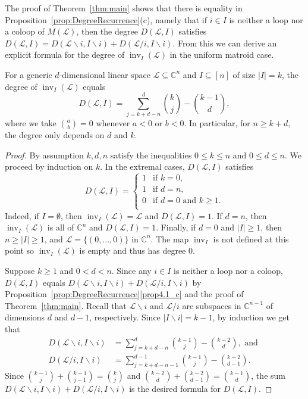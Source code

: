\documentclass[ALCO,ThmDefs,Unicode,epreuves]{cedram}
\newcommand{\Cbb}{\mathbb{C}}
\newcommand{\cL}{\mathcal{L}}
\DeclareMathOperator{\inv}{inv}
\begin{document}
 
 
 
The proof of Theorem~\ref{thm:main} shows that there is equality in Proposition~\ref{prop:DegreeRecurrence}(c), namely that 
if $i\in I$ is neither a loop nor a coloop of $M(\cL)$, then the degree $D(\cL, I) $ satisfies $D(\cL, I) = D(\cL\backslash i, I\backslash i ) + D(\cL/ i, I\backslash i )$. 
From this we can derive an explicit formula for the degree of $\inv_I(\cL)$ in the uniform matroid case. 



\begin{coro}\label{cor:genericDegree}
For a generic $d$-dimensional linear space $\cL \subseteq \Cbb^n$ and $I\subseteq [n]$ of size $|I|=k$, the degree of $\inv_I(\cL)$ equals 
\[
D(\cL,I)= \sum_{j=k+d - n}^{d}\binom{k}{j} -\binom{k-1}{d} ,
\] 
where we take $\binom{a}{b}=0$ whenever $a < 0$ or $b<0$. In particular, for $n \geq k+d$, the degree only depends on $d$ and $k$. 
\end{coro}
\begin{proof}
By assumption $k,d,n$ satisfy the inequalities $0\leq k \leq n$ and $0\leq d \leq n$.
We proceed by induction on $k$. In the extremal cases, $D(\cL, I)$ satisfies 
\[
D(\cL,I) = 
\begin{cases}
1 & \text{if }k=0, \\
1 & \text{if } d=n, \\
0 & \text{if }d= 0 \text{ and } k \geq 1. \\
\end{cases}
\]
Indeed, if $I = \emptyset$, then $\inv_I(\cL) = \cL$ and $D(\cL,I) = 1$. If $d=n$, then $\inv_I(\cL)$ is all of $\Cbb^n$ and $D(\cL,I) = 1$. 
Finally, if $d=0$ and $|I|\geq 1$, then $n\geq |I| \geq 1$, and $\cL= \{(0,\ldots , 0)\}$ in $\Cbb^n$. The map $\inv_I$ is not defined at this point so $\inv_I(\cL)$
is empty and thus has degree $0$. 

Suppose $k\geq 1$ and $0 <d < n$. 
Since any $i\in I$ is neither a loop nor a coloop, $D(\cL, I) $ equals $D(\cL\backslash i, I\backslash i ) + D(\cL/ i, I\backslash i )$ by Proposition~\ref{prop:DegreeRecurrence}\ref{prop4.1_c} and the proof of Theorem~\ref{thm:main}. Recall that $\cL\backslash i$ and $\cL/i$ are subspaces in $\Cbb^{n-1}$ of dimensions $d$ and $d-1$, respectively. 
Since $|I\backslash i| = k-1$, by induction we get that 
\begin{align*}
 D(\cL\backslash i, I\backslash i ) &= \sum_{j=k+d - n}^{d}\binom{k-1}{j} -\binom{k-2}{d},
 \text{ and } \\
 D(\cL/i, I\backslash i ) &= \sum_{j=k+d - n-1}^{d-1}\binom{k-1}{j} -\binom{k-2}{d-1}.
\end{align*}
Since $\binom{k-1}{j} + \binom{k-1}{j-1} = \binom{k}{j}$ and $\binom{k-2}{d} + \binom{k-2}{d-1}= \binom{k-1}{d}$, 
the sum $D(\cL\backslash i, I\backslash i ) + D(\cL/ i, I\backslash i )$ is the desired formula for $D(\cL, I)$. 
\end{proof}
\end{document}
